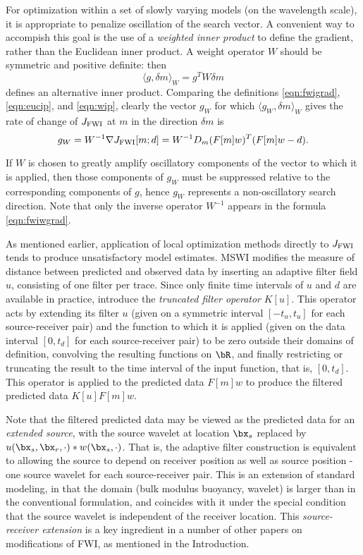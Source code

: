 For optimization within a set of slowly varying models (on the
wavelength scale),  it is appropriate to penalize oscillation of the
search vector. A convenient way to accompish this goal is the use of a
{\em weighted inner product} to define the gradient, rather than the
Euclidean inner product. A weight operator $W$ should be symmetric and
positive definite: then
\begin{equation}
  \label{eqn:wip}
  \langle g, \delta m\rangle_W = g^TW\delta m
\end{equation}
defines an alternative inner product. Comparing the definitions
\ref{eqn:fwigrad}, \ref{eqn:eucip}, and \ref{eqn:wip}, clearly the
vector $g_W$ for which $\langle g_W, \delta m \rangle_W$ gives the
rate of change of $J_{\rm FWI}$ at $m$ in the direction $\delta m$ is
\begin{equation}
  \label{eqn:fwiwgrad}
  g_W = W^{-1}\nabla  J_{\rm FWI}[m;d] =W^{-1} D_m(F[m]w)^T(F[m]w-d).
\end{equation}

If $W$ is chosen to greatly
amplify oscillatory components of the vector to which it is applied,
then those components of $g_W$ must be suppressed relative to the
corresponding components of $g$, hence $g_W$ represents a
non-oscillatory search direction. Note that only the inverse operator
$W^{-1}$ appears in the formula \ref{eqn:fwiwgrad}.

As mentioned earlier, application of local optimization methods
directly to $J_{\rm FWI}$ tends to produce unsatisfactory model
estimates. MSWI modifies the measure of distance between predicted and
observed data by inserting an adaptive filter field $u$, consisting of
one filter per trace. Since only finite time intervals of $u$ and $d$ are available in
practice, introduce the {\em truncated filter operator} $K[u]$. This
operator acts by extending its filter $u$ (given on a symmetric
interval $[-t_u,t_u]$ for each source-receiver pair) and the function to which
it is applied (given on the data interval $[0,t_d]$ for each
source-receiver pair) to be zero outside their domains of definition, convolving the
resulting functions on $\bR$, and finally restricting or truncating
the result to the time interval of the input function, that is,
$[0,t_d]$. This operator is applied to the predicted data $F[m]w$ to
produce the filtered predicted data $K[u]F[m]w$.

Note that the filtered predicted data may be viewed as the predicted
data for an {\em extended source}, with the source wavelet at location
$\bx_s$ replaced by $u(\bx_s,\bx_r,\cdot) * w(\bx_s,\cdot)$. That is,
the adaptive filter construction is equivalent to allowing the source
to depend on receiver position as well as source position - one source
wavelet for each source-receiver pair. This is an extension of
standard modeling, in that the domain (bulk modulus buoyancy, wavelet)
is larger than in the conventional formulation, and coincides with it
under the special condition that the source wavelet is independent of
the receiver location. This  {\em
  source-receiver extension}\cite[]{HuangSymes2015SEG} is a key ingredient in a number of
other papers on modifications of FWI, as mentioned in the Introduction.

